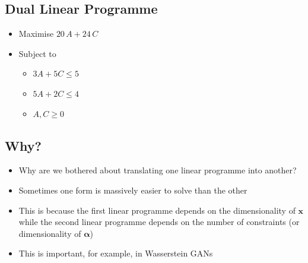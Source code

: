 
\begin{slide}
\section{Dual Linear Programme}

\pb
\begin{minipage}{0.4\linewidth}
    \begin{itemize}
    \item Maximise $20\,A + 24\,C$
    \item Subject to
      \begin{itemize}
      \item $3 A + 5 C \leq 5$
      \item $5 A + 2 C \leq 4$
      \item $A, C \geq 0$\pause
      \end{itemize}
    \end{itemize}
\end{minipage}\hfill
\begin{minipage}{0.55\linewidth}
  \pause
\end{minipage}
\end{slide}


\begin{slide}
\section{Why?}

\begin{PauseHighLight}
  \begin{itemize}
  \item Why are we bothered about translating one linear programme
    into another?\pause
  \item Sometimes one form is massively easier to solve than the
    other\pause
  \item This is because the first linear programme depends on the
    dimensionality of $\bm{x}$ while the second linear programme
    depends on the number of constraints (or dimensionality of
    $\bm{\alpha}$)\pause
  \item This is important, for example, in Wasserstein GANs\pause
  \end{itemize}
\end{PauseHighLight}

\end{slide}


